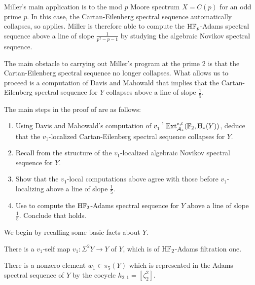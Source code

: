 Miller's main application is to the mod $p$ Moore spectrum $X = C(p)$ for an odd prime $p$. In this case, the Cartan-Eilenberg spectral sequence automatically collapses, so  applies. Miller is therefore able to compute the $\mathrm{H}\mathbb{F}_p$-Adams spectral sequence above a line of slope $\frac{1}{p^2-p-1}$ by studying the algebraic Novikov spectral sequence.

The main obstacle to carrying out Miller's program at the prime $2$ is that the Cartan-Eilenberg spectral sequence no longer collapses. What allows us to proceed is a computation of Davis and Mahowald \cite{v1ExtDavisMahowald} that implies that the Cartan-Eilenberg spectral sequence for $Y$ collapses above a line of slope $\frac{1}{5}$. %

The main steps in the proof of  are as follows:

\begin{enumerate}
    \item Using Davis and Mahowald's computation \cite{v1ExtDavisMahowald} of $v_1 ^{-1} \operatorname{\mathrm{Ext}}^{s,t} _{\operatorname{\mathcal{A}}_*} (\operatorname{\mathbb{F}}_2, \mathrm{H}_* (Y))$, deduce that the $v_1$-localized Cartan-Eilenberg spectral sequence collapses for $Y$.
    \item Recall from \cite{Miller} the structure of the $v_1$-localized algebraic Novikov spectral sequence for $Y$.
    \item Show that the $v_1$-local computations above agree with those before $v_1$-localizing above a line of slope $\frac{1}{5}$.
    \item Use  to compute the $\mathrm{H}\mathbb{F}_2$-Adams spectral sequence for $Y$ above a line of slope $\frac{1}{5}$. Conclude that  holds.
\end{enumerate}

We begin by recalling some basic facts about $Y$.

\begin{prop}\label{prop:v1-self-map}
	There is a $v_1$-self map $v_1 : \Sigma^2 Y \to Y$ of $Y$, which is of $\mathrm{H}\mathbb{F}_2$-Adams filtration one.
\end{prop}

\begin{lem}\label{lemm:h21-lives}
	There is a nonzero element $w_1 \in \pi_5 (Y)$ which is represented in the Adams spectral sequence of $Y$ by the cocycle $h_{2,1} = [\zeta_2 ^2]$.
\end{lem}

